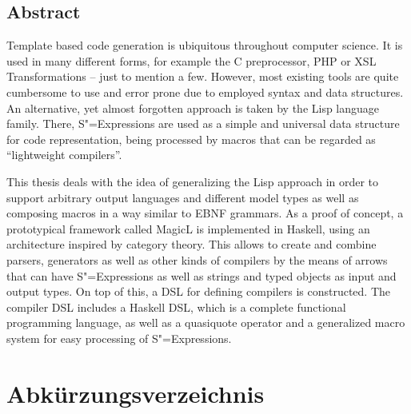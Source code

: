 \documentclass[12pt, a4paper, bibgerm]{scrbook}
\newcommand{\sexps}{S"=Expressions}
\begin{document}
\section*{\centering Abstract}

Template based code generation is ubiquitous throughout computer
science.  It is used in many different forms, for example the C
preprocessor, PHP or XSL Transformations -- just to mention a
few. However, most existing tools are quite cumbersome to use and error
prone due to employed syntax and data structures. An alternative, yet
almost forgotten approach is taken by the Lisp language family. There,
\sexps{} are used as a simple and universal data structure for code
representation, being processed by macros that can be regarded as
``lightweight compilers''.

This thesis deals with the idea of generalizing the Lisp approach in
order to support arbitrary output languages and different model types as
well as composing macros in a way similar to EBNF grammars. As a proof
of concept, a prototypical framework called MagicL is implemented in
Haskell, using an architecture inspired by category theory. This allows
to create and combine parsers, generators as well as other kinds of
compilers by the means of arrows that can have \sexps{} as well as
strings and typed objects as input and output types.  On top of this, a
DSL for defining compilers is constructed. The compiler DSL includes a
Haskell DSL, which is a complete functional programming language, as
well as a quasiquote operator and a generalized macro system for easy
processing of \sexps.

\cleardoublepage
\setcounter{tocdepth}{1}

\tableofcontents

\chapter*{Abkürzungsverzeichnis}
\begin{acronym}
\end{acronym}
\end{document}
